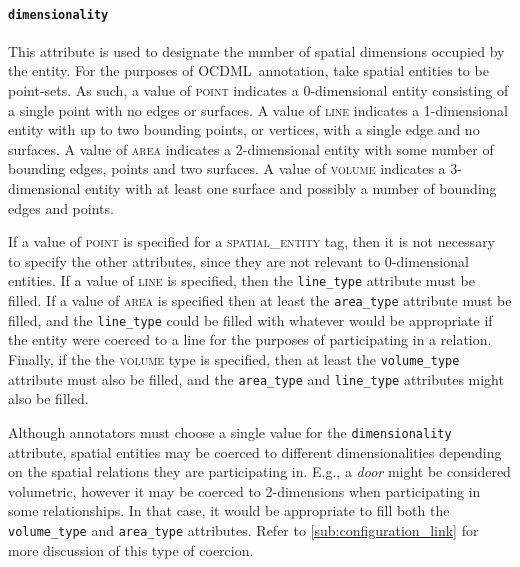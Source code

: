 \documentclass[11pt]{article}
\newcommand{\ML}{OCDML}
\newenvironment{note}
{\list{}
 {\setlength
  {\itemindent}
  {\listparindent}}
   \item[\textbf{Note:}]\relax}
{\endlist}
\begin{document}
\paragraph{\texttt{dimensionality}} %
\label{par:dimensionality}
This attribute is used to designate the number of spatial dimensions occupied by the entity. For the purposes of \ML~annotation, take spatial entities to be point-sets. As such, a value of \textsc{point} indicates a 0-dimensional entity consisting of a single point with no edges or surfaces. A value of \textsc{line} indicates a 1-dimensional entity with up to two bounding points, or vertices, with a single edge and no surfaces. A value of \textsc{area} indicates a 2-dimensional entity with some number of bounding edges, points and two surfaces. A value of \textsc{volume} indicates a 3-dimensional entity with at least one surface and possibly a number of bounding edges and points.

If a value of \textsc{point} is specified for a \textsc{spatial\_entity} tag, then it is not necessary to specify the other attributes, since they are not relevant to 0-dimensional entities. If a value of \textsc{line} is specified, then the \texttt{line\_type} attribute must be filled. If a value of \textsc{area} is specified then at least the \texttt{area\_type} attribute must be filled, and the \texttt{line\_type} could be filled with whatever would be appropriate if the entity were coerced to a line for the purposes of participating in a relation. Finally, if the the \textsc{volume} type is specified, then at least the \texttt{volume\_type} attribute must also be filled, and the \texttt{area\_type} and \texttt{line\_type} attributes might also be filled.

\begin{note}
Although annotators must choose a single value for the \texttt{dimensionality} attribute, spatial entities may be coerced to different dimensionalities depending on the spatial relations they are participating in. E.g., a \emph{door} might be considered volumetric, however it may be coerced to 2-dimensions when participating in some relationships. In that case, it would be appropriate to fill both the \texttt{volume\_type} and \texttt{area\_type} attributes. Refer to \cref{sub:configuration_link} for more discussion of this type of coercion.
\end{note}

\end{document}
